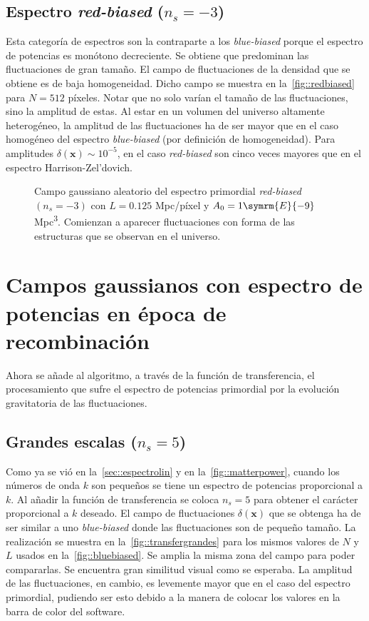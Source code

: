 \subsection{Espectro \textit{red-biased} (\texorpdfstring{\(n_s=-3\)}{ns=-3})}
Esta categoría de espectros son la contraparte a los \textit{blue-biased} porque el espectro de potencias es monótono decreciente. Se obtiene que predominan las fluctuaciones de gran tamaño. El campo de fluctuaciones de la densidad que se obtiene es de baja homogeneidad. Dicho campo se muestra en la~\autoref{fig::redbiased} para \(N=512\) píxeles. Notar que no solo varían el tamaño de las fluctuaciones, sino la amplitud de estas. Al estar en un volumen del universo altamente heterogéneo, la amplitud de las fluctuaciones ha de ser mayor que en el caso homogéneo del espectro \textit{blue-biased} (por definición de homogeneidad). Para amplitudes \(\delta(\symbf{x})\sim 10^{-5}\), en el caso \textit{red-biased} son cinco veces mayores que en el espectro Harrison-Zel'dovich.
\begin{figure}[h!]
    \centering
    {}
    \caption[Espectro primordial \textit{red-biased} \(N=512\) píxeles]{Campo gaussiano aleatorio del espectro primordial \textit{red-biased} \((n_s=-3)\) con \(L=0.125\) Mpc/píxel y \(A_0=1\symrm{E}{-9}\) Mpc\textsuperscript{3}. Comienzan a aparecer fluctuaciones con forma de las estructuras que se observan en el universo.}
    \label{fig::redbiased}
\end{figure}
\clearpage
\section{Campos gaussianos con espectro de potencias en época de recombinación}
Ahora se añade al algoritmo, a través de la función de transferencia, el procesamiento que sufre el espectro de potencias primordial por la evolución gravitatoria de las fluctuaciones.
\subsection{Grandes escalas (\texorpdfstring{\(n_s=5\)}{ns=5})}
Como ya se vió en la~\autoref{sec::espectrolin} y en la~\autoref{fig::matterpower}, cuando los números de onda \(k\) son pequeños se tiene un espectro de potencias proporcional a \(k\). Al añadir la función de transferencia se coloca \(n_s=5\) para obtener el carácter proporcional a \(k\) deseado. El campo de fluctuaciones \(\delta(\symbf{x})\) que se obtenga ha de ser similar a uno \textit{blue-biased} donde las fluctuaciones son de pequeño tamaño. La realización se muestra en la~\autoref{fig::transfergrandes} para los mismos valores de \(N\) y \(L\) usados en la~\autoref{fig::bluebiased}. Se amplia la misma zona del campo para poder compararlas. Se encuentra gran similitud visual como se esperaba. La amplitud de las fluctuaciones, en cambio, es levemente mayor que en el caso del espectro primordial, pudiendo ser esto debido a la manera de colocar los valores en la barra de color del software.


